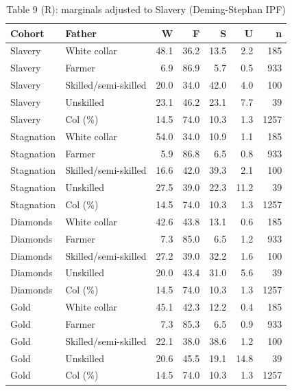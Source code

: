 \begin{table}

\caption{Table 9 (R): marginals adjusted to Slavery (Deming-Stephan IPF)}
\centering
\begin{tabular}[t]{llrrrrr}
\toprule
Cohort & Father & W & F & S & U & n\\
\midrule
Slavery & White collar & 48.1 & 36.2 & 13.5 & 2.2 & 185\\
Slavery & Farmer & 6.9 & 86.9 & 5.7 & 0.5 & 933\\
Slavery & Skilled/semi-skilled & 20.0 & 34.0 & 42.0 & 4.0 & 100\\
Slavery & Unskilled & 23.1 & 46.2 & 23.1 & 7.7 & 39\\
Slavery & Col (\%) & 14.5 & 74.0 & 10.3 & 1.3 & 1257\\
\addlinespace
Stagnation & White collar & 54.0 & 34.0 & 10.9 & 1.1 & 185\\
Stagnation & Farmer & 5.9 & 86.8 & 6.5 & 0.8 & 933\\
Stagnation & Skilled/semi-skilled & 16.6 & 42.0 & 39.3 & 2.1 & 100\\
Stagnation & Unskilled & 27.5 & 39.0 & 22.3 & 11.2 & 39\\
Stagnation & Col (\%) & 14.5 & 74.0 & 10.3 & 1.3 & 1257\\
\addlinespace
Diamonds & White collar & 42.6 & 43.8 & 13.1 & 0.6 & 185\\
Diamonds & Farmer & 7.3 & 85.0 & 6.5 & 1.2 & 933\\
Diamonds & Skilled/semi-skilled & 27.2 & 39.0 & 32.2 & 1.6 & 100\\
Diamonds & Unskilled & 20.0 & 43.4 & 31.0 & 5.6 & 39\\
Diamonds & Col (\%) & 14.5 & 74.0 & 10.3 & 1.3 & 1257\\
\addlinespace
Gold & White collar & 45.1 & 42.3 & 12.2 & 0.4 & 185\\
Gold & Farmer & 7.3 & 85.3 & 6.5 & 0.9 & 933\\
Gold & Skilled/semi-skilled & 22.1 & 38.0 & 38.6 & 1.2 & 100\\
Gold & Unskilled & 20.6 & 45.5 & 19.1 & 14.8 & 39\\
Gold & Col (\%) & 14.5 & 74.0 & 10.3 & 1.3 & 1257\\
\bottomrule
\end{tabular}
\end{table}
